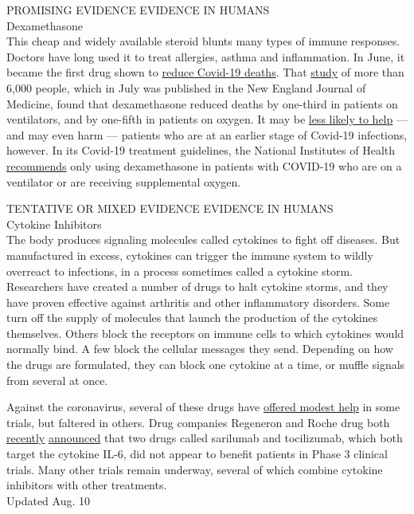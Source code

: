PROMISING EVIDENCE EVIDENCE IN HUMANS\\
Dexamethasone\\
This cheap and widely available steroid blunts many types of immune
responses. Doctors have long used it to treat allergies, asthma and
inflammation. In June, it became the first drug shown to
\href{https://www.nytimes3xbfgragh.onion/2020/06/16/world/europe/dexamethasone-coronavirus-covid.html?searchResultPosition=5}{reduce
Covid-19 deaths}. That
\href{https://www.nejm.org/doi/full/10.1056/NEJMoa2021436?query=featured_home}{study}
of more than 6,000 people, which in July was published in the New
England Journal of Medicine, found that dexamethasone reduced deaths by
one-third in patients on ventilators, and by one-fifth in patients on
oxygen. It may be
\href{https://www.nytimes3xbfgragh.onion/2020/06/24/health/coronavirus-dexamethasone.html?searchResultPosition=2}{less
likely to help} --- and may even harm --- patients who are at an earlier
stage of Covid-19 infections, however. In its Covid-19 treatment
guidelines, the National Institutes of Health
\href{https://www.covid19treatmentguidelines.nih.gov/dexamethasone/}{recommends}
only using dexamethasone in patients with COVID-19 who are on a
ventilator or are receiving supplemental oxygen.

TENTATIVE OR MIXED EVIDENCE EVIDENCE IN HUMANS\\
Cytokine Inhibitors\\
The body produces signaling molecules called cytokines to fight off
diseases. But manufactured in excess, cytokines can trigger the immune
system to wildly overreact to infections, in a process sometimes called
a cytokine storm. Researchers have created a number of drugs to halt
cytokine storms, and they have proven effective against arthritis and
other inflammatory disorders. Some turn off the supply of molecules that
launch the production of the cytokines themselves. Others block the
receptors on immune cells to which cytokines would normally bind. A few
block the cellular messages they send. Depending on how the drugs are
formulated, they can block one cytokine at a time, or muffle signals
from several at once.

Against the coronavirus, several of these drugs have
\href{https://www.medrxiv.org/content/10.1101/2020.06.01.20119149v2}{offered
modest help} in some trials, but faltered in others. Drug companies
Regeneron and Roche drug both
\href{https://newsroom.regeneron.com/news-releases/news-release-details/regeneron-and-sanofi-provide-update-kevzarar-sarilumab-phase-3}{recently}
\href{https://www.roche.com/investors/updates/inv-update-2020-07-29.htm}{announced}
that two drugs called sarilumab and tocilizumab, which both target the
cytokine IL-6, did not appear to benefit patients in Phase 3 clinical
trials. Many other trials remain underway, several of which combine
cytokine inhibitors with other treatments.\\
Updated Aug. 10

